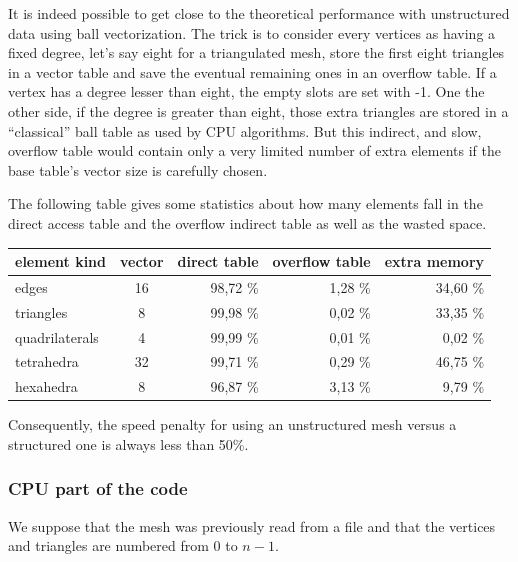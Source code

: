\documentclass[a4paper,12pt]{article}
\begin{document}
It is indeed possible to get close to the theoretical performance with unstructured data using ball vectorization. The trick is to consider every vertices as having a fixed degree, let's say eight for a triangulated mesh, store the first eight triangles in a vector table and save the eventual remaining ones in an overflow table. If a vertex has a degree lesser than eight, the empty slots are set with -1. One the other side, if the degree is greater than eight, those extra triangles are stored in a ``classical'' ball table as used by CPU algorithms. But this indirect, and slow, overflow table would contain only a very limited number of extra elements if the base table's vector size is carefully chosen.

The following table gives some statistics about how many elements fall in the direct access table and the overflow indirect table as well as the wasted space.

\medskip

\begin{tabular}{|l|c|r|r|r|}
\hline
element kind   & vector & direct table & overflow table & extra memory \\
\hline
edges          &      16 &      98,72 \% &           1,28 \% & 34,60 \% \\
triangles      &       8 &      99,98 \% &           0,02 \% & 33,35 \% \\
quadrilaterals &       4 &      99,99 \% &           0,01 \% &  0,02 \% \\
tetrahedra     &      32 &      99,71 \% &           0,29 \% & 46,75 \% \\
hexahedra      &       8 &      96,87 \% &           3,13 \% &  9,79 \% \\
\hline
\end{tabular}

Consequently, the speed penalty for using an unstructured mesh versus a structured one is always less than 50\%.

\subsubsection{CPU part of the code}
We suppose that the mesh was previously read from a file and that the vertices and triangles are numbered from 0 to $n-1$.
\end{document}
